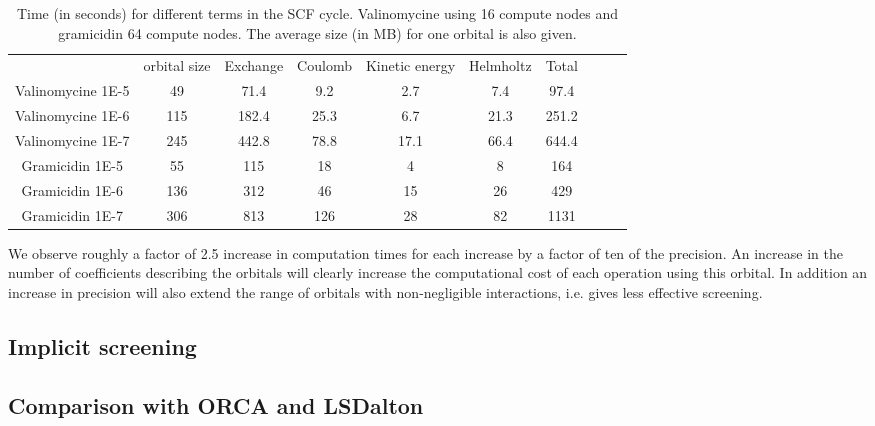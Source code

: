 \documentclass{article}
\begin{document}
\begin{table}[t]
\label{tab:prec}
    \centering
    \begin{tabular}{cccccccccc}
&orbital size& Exchange &  Coulomb & Kinetic energy& Helmholtz & Total \\
 Valinomycine 1E-5& 49 & 71.4& 9.2& 2.7 & 7.4& 97.4\\
Valinomycine 1E-6& 115 & 182.4& 25.3& 6.7 & 21.3&251.2\\
Valinomycine 1E-7& 245 & 442.8& 78.8&17.1& 66.4&644.4  \\
 Gramicidin 1E-5&55&115&18& 4& 8& 164\\
  Gramicidin 1E-6&136&312 & 46& 15 & 26& 429\\
  Gramicidin 1E-7&306& 813&126& 28& 82& 1131\\ %
    \end{tabular}
    \caption{Time (in seconds) for different terms in the SCF cycle. Valinomycine using 16 compute nodes and gramicidin 64 compute nodes. The average size (in MB) for one orbital is also given.} %
    \label{tab:times}
\end{table}

We observe roughly a factor of 2.5 increase in computation times for each increase by a factor of ten of the precision. 
An increase in the number of coefficients describing the orbitals will clearly increase the computational cost of each operation using this orbital. In addition an increase in precision will also extend the range of orbitals with non-negligible interactions, i.e. gives less effective screening.



\subsection{Implicit screening}

\subsection{Comparison with ORCA  and LSDalton  }
\end{document}
